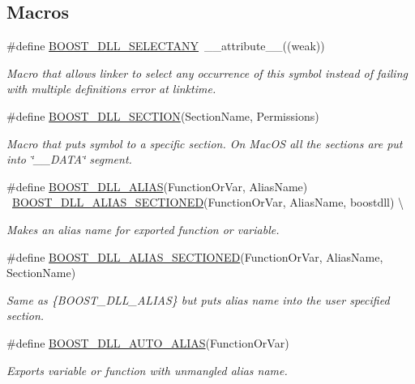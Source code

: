 \subsection*{Macros}
\begin{DoxyCompactItemize}
\item 
\#define \hyperlink{a00359_a18e217f7c26bce9cb08c64f41fbd6178}{B\+O\+O\+S\+T\+\_\+\+D\+L\+L\+\_\+\+S\+E\+L\+E\+C\+T\+A\+NY}~\+\_\+\+\_\+attribute\+\_\+\+\_\+((weak))
\begin{DoxyCompactList}\small\item\em Macro that allows linker to select any occurrence of this symbol instead of failing with \textquotesingle{}multiple definitions\textquotesingle{} error at linktime. \end{DoxyCompactList}\item 
\#define \hyperlink{a00359_ab416588e7b88e00ec82b45a38e84011b}{B\+O\+O\+S\+T\+\_\+\+D\+L\+L\+\_\+\+S\+E\+C\+T\+I\+ON}(Section\+Name,  Permissions)                                                                                      
\begin{DoxyCompactList}\small\item\em Macro that puts symbol to a specific section. On Mac\+OS all the sections are put into \char`\"{}\+\_\+\+\_\+\+D\+A\+T\+A\char`\"{} segment. \end{DoxyCompactList}\item 
\#define \hyperlink{a00359_ac6f899fe303b7df9e1f4d747a9c0d495}{B\+O\+O\+S\+T\+\_\+\+D\+L\+L\+\_\+\+A\+L\+I\+AS}(Function\+Or\+Var,  Alias\+Name)                                          ~\hyperlink{a00359_ae778e0f6a242f71b2664aa5fa8380a09}{B\+O\+O\+S\+T\+\_\+\+D\+L\+L\+\_\+\+A\+L\+I\+A\+S\+\_\+\+S\+E\+C\+T\+I\+O\+N\+ED}(Function\+Or\+Var, Alias\+Name, boostdll)       \textbackslash{}
\begin{DoxyCompactList}\small\item\em Makes an alias name for exported function or variable. \end{DoxyCompactList}\item 
\#define \hyperlink{a00359_ae778e0f6a242f71b2664aa5fa8380a09}{B\+O\+O\+S\+T\+\_\+\+D\+L\+L\+\_\+\+A\+L\+I\+A\+S\+\_\+\+S\+E\+C\+T\+I\+O\+N\+ED}(Function\+Or\+Var,  Alias\+Name,  Section\+Name)                                            
\begin{DoxyCompactList}\small\item\em Same as \{B\+O\+O\+S\+T\+\_\+\+D\+L\+L\+\_\+\+A\+L\+I\+AS\} but puts alias name into the user specified section. \end{DoxyCompactList}\item 
\#define \hyperlink{a00359_a2f1ae6e8c56d015aa0117a63d2017a95}{B\+O\+O\+S\+T\+\_\+\+D\+L\+L\+\_\+\+A\+U\+T\+O\+\_\+\+A\+L\+I\+AS}(Function\+Or\+Var)                                                                                                      
\begin{DoxyCompactList}\small\item\em Exports variable or function with unmangled alias name. \end{DoxyCompactList}\end{DoxyCompactItemize}


